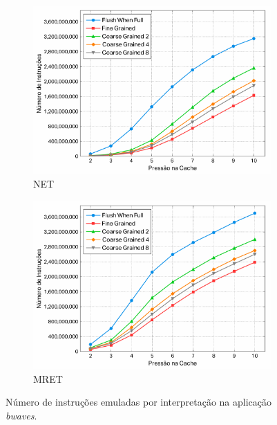 \documentclass[12pt,twoside]{article}
\begin{document}
\begin{figure}[!ht]
        \centering
        \begin{subfigure}[b]{0.45\textwidth}
                \includegraphics[width=\textwidth]{./figs/net-bwaves-freq-int}
                \caption{NET}
                \label{fig-net-bwaves-freq-int}
        \end{subfigure}
        \quad %
                \begin{subfigure}[b]{0.45\textwidth}
                \includegraphics[width=\textwidth]{./figs/mret-bwaves-freq-int}
                \caption{MRET}
                \label{fig-mret-bwaves-freq-int}
        \end{subfigure}
\caption{Número de instruções emuladas por interpretação na aplicação \emph{bwaves}.}
\end{figure}
\end{document}
